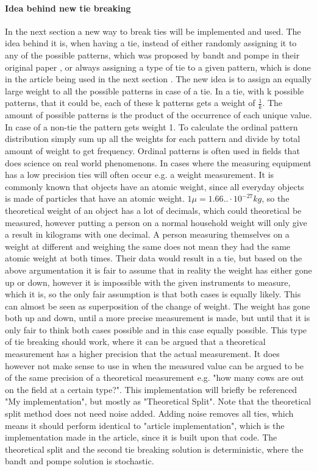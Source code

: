 \FloatBarrier

\paragraph{Idea behind new tie breaking}
In the next section a new way to break ties will be implemented and used. The idea behind it is, when having a tie, instead of either randomly assigning it to any of the possible patterns, which was proposed by bandt and pompe in their original paper \cite{Bandt2002}, or always assigning a type of tie to a given pattern, which is done in the article being used in the next section \cite{Chagas2022}. The new idea is to assign an equally large weight to all the possible patterns in case of a tie. In a tie, with k possible patterns, that it could be, each of these k patterns gets a weight of $\frac{1}{k}$. The amount of possible patterns is the product of the occurrence of each unique value. In case of a non-tie the pattern gets weight 1. To calculate the ordinal pattern distribution simply sum up all the weights for each pattern and divide by total amount of weight to get frequency. Ordinal patterns is often used in fields that does science on real world phenomenons. In cases where the measuring equipment has a low precision ties will often occur e.g. a weight measurement. It is commonly known that objects have an atomic weight, since all everyday objects is made of particles that have an atomic weight. $1\mu = 1.66..\cdot10^{-27}kg$, so the theoretical weight of an object has a lot of decimals, which could theoretical be measured, however putting a person on a normal household weight  will only give a result in kilograms with one decimal. A person measuring themselves on a weight at different and weighing the same does not mean they had the same atomic weight at both times. Their data would result in a tie, but based on the above argumentation it is fair to assume that in reality the weight has either gone up or down, however it is impossible with the given instruments to measure, which it is, so the only fair assumption is that both cases is equally likely. This can almost be seen as superposition\cite{Schroedinger1926} of the change of weight. The weight has gone both up and down, until a more precise measurement is made, but until that it is only fair to think both cases possible and in this case equally possible. This type of tie breaking should work, where it can be argued that a theoretical measurement has a higher precision that the actual measurement. It does however not make sense to use in when the measured value can be argued to be of the same precision of a theoretical measurement e.g. "how many cows are out on the field at a certain type?". This implementation will briefly be referenced "My implementation", but mostly as "Theoretical Split". Note that the theoretical split method does not need noise added. Adding noise removes all ties, which means it should perform identical to "article implementation", which is the implementation made in the article\cite{Chagas2022}, since it is built upon that code. The theoretical split and the second tie breaking solution is deterministic, where the bandt and pompe solution is stochastic.


